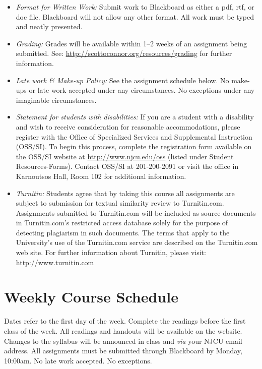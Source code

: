 \documentclass[article,oneside]{memoir}
\begin{document}
\begin{itemize}
\item \textit{Format for Written Work:} Submit work to Blackboard as either a pdf, rtf, or doc file. Blackboard will not allow any other format. All work must be typed and neatly presented. 


\item \textit{Grading:} Grades will be available within 1--2 weeks of an assignment being submitted. See: \href{http://scottoconnor.org/resources/grading}{http://scottoconnor.org/resources/grading} for further information.


\item \textit{Late work \& Make-up Policy:} See the assignment schedule below. No make-ups or late work accepted under any circumstances. No exceptions under any imaginable circumstances.


\item \textit{Statement for students with disabilities:} If you are a student
with a disability and wish to receive consideration for reasonable
accommodations, please register with the Office of Specialized Services
and Supplemental Instruction (OSS/SI). To begin this process, complete
the registration form available on the OSS/SI website at
\href{http://www.njcu.edu/oss}{http://www.njcu.edu/oss}
(listed under Student Resources-Forms). Contact OSS/SI at 201-200-2091
or visit the office in Karnoutsos Hall, Room 102 for additional
information.

\item \textit{Turnitin:} Students agree that by taking this course all assignments are subject to submission for textual similarity review to Turnitin.com. Assignments submitted to Turnitin.com will be included as source documents in Turnitin.com's restricted access database solely for the purpose of detecting plagiarism in such documents.  The terms that apply to the University’s use of the Turnitin.com service are described on the Turnitin.com web site.  For further information about Turnitin, please visit: http://www.turnitin.com 
\end{itemize}



\section{Weekly Course Schedule}
Dates refer to the first day of the week. Complete the readings before the first class of the week. All readings and handouts will be available on the website. Changes to the syllabus will be announced in class and \emph{via} your NJCU email address. All assignments must be submitted through Blackboard by Monday, 10:00am. No late work accepted. No exceptions. 
\end{document}
